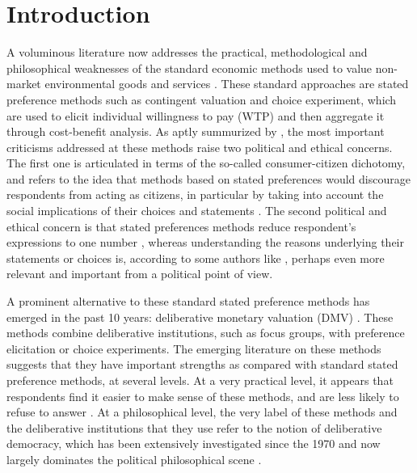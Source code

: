 \documentclass[version=last, pagesize, twoside=off, bibliography=totoc, DIV=calc, fontsize=14pt, a4paper, french, english]{scrartcl}
\begin{document}
\section{Introduction}
A voluminous literature now addresses the practical, methodological and philosophical weaknesses of the standard economic methods used to value non-market environmental goods and services \citep{meinard_ethical_2016}. These standard approaches are stated preference methods such as contingent valuation and choice experiment, which are used to elicit individual willingness to pay (WTP) and then aggregate it through cost-benefit analysis. As aptly summurized by \citet{bartkowski_beyond_2018}, the most important criticisms addressed at these methods raise two political and ethical concerns. The first one is articulated in terms of the so-called consumer-citizen dichotomy, and refers to the idea that methods based on stated preferences would discourage respondents from acting as citizens, in particular by taking into account the social implications of their choices and statements \citep{soma_representing_2014, vatn_institutional_2009}. The second political and ethical concern is that stated preferences methods reduce respondent's expressions to one number , whereas understanding the reasons underlying their statements or choices is, according to some authors like \citet{sen_environmental_1995}, perhaps even more relevant and important from a political point of view.

A prominent alternative to these standard stated preference methods has emerged in the past 10 years: deliberative monetary valuation (DMV) \citep{spash_deliberative_2007,bartkowski_economic_2017}. These methods combine deliberative institutions, such as focus groups, with preference elicitation or choice experiments. The emerging literature on these methods suggests that they have important strengths as compared with standard stated preference methods, at several levels. At a very practical level, it appears that respondents find it easier to make sense of these methods, and are less likely to refuse to answer \citep{lienhoop_contingent_2007,szabo_reducing_2011}. At a philosophical level, the very label of these methods and the deliberative institutions that they use refer to the notion of deliberative democracy, which has been extensively investigated since the 1970 and now largely dominates the political philosophical scene \citep{chappell_deliberative_2012}.
\end{document}
